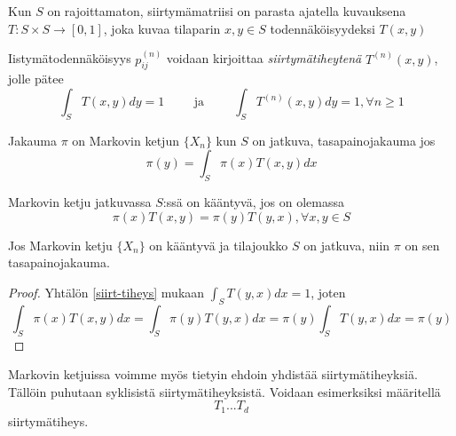 \begin{maar}
	Kun $S$ on rajoittamaton, siirtymämatriisi on parasta ajatella kuvauksena $T: S\times S \rightarrow [0,1]$, joka kuvaa tilaparin $x,y\in S$ todennäköisyydeksi $T(x,y)$
\end{maar}

\begin{maar}
	Iistymätodennäköisyys $p^{(n)}_{ij}$ voidaan kirjoittaa \textit{siirtymätiheytenä} $T^{(n)}(x,y)$, jolle pätee
	\begin{equation}\label{siirt-tiheys}
		\int_S T(x,y)dy = 1 \hspace{1cm} \text{ja} \hspace{1cm} \int_S T^{(n)}(x,y)dy = 1, \forall n \geq 1
	\end{equation}
\end{maar}

\begin{maar}
	Jakauma $\pi$ on Markovin ketjun $\{ X_n \}$ kun $S$ on jatkuva, tasapainojakauma jos 
	\begin{equation}
		\pi(y) = \int_S \pi(x) T(x,y) dx
	\end{equation}
\end{maar}

\begin{maar}\label{kaant-jatk}
	Markovin ketju jatkuvassa $S$:ssä on kääntyvä, jos on olemassa 
	\begin{equation}
		\pi(x)T(x,y)=\pi(y)T(y,x), \forall x,y\in S
	\end{equation}
\end{maar}

\begin{lause}
	Jos Markovin ketju $\{X_n\}$ on kääntyvä ja tilajoukko $S$ on jatkuva, niin $\pi$ on sen tasapainojakauma.
\end{lause}

\begin{proof}
	Yhtälön \ref{siirt-tiheys} mukaan $\int_S T(y,x)dx = 1$, joten
	\begin{equation}
		\int_S \pi(x) T(x,y) dx = \int_S \pi(y) T(y,x) dx = \pi(y)\int_S T(y,x) dx = \pi(y)
	\end{equation}
\end{proof}

\begin{maar}
	Markovin ketjuissa voimme myös tietyin ehdoin yhdistää siirtymätiheyksiä. Tällöin puhutaan syklisistä siirtymätiheyksistä. Voidaan esimerksiksi määritellä
	\begin{equation*}
		T_1...T_d
	\end{equation*}
	siirtymätiheys.
\end{maar}

